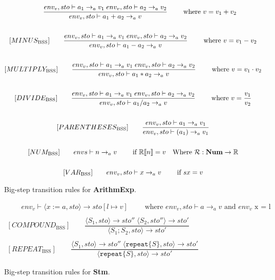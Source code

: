 \begin{figure}[htbp]
	\centering
	\begin{gather*}
		[PLUS_\text{BSS}] 
		\qquad \dfrac
		{\envs \vdash a_1 \rightarrow_a v_1 \; \envs \vdash a_2 \rightarrow_a v_2}
		{\envs \vdash a_1 + a_2 \rightarrow_a v}
		\qquad \text{ where }v = v_1 + v_2
		\\
		\\
		[MINUS_\text{BSS}] 
		\qquad \dfrac
		{\envs \vdash a_1 \rightarrow_a v_1 \; \envs \vdash a_2 \rightarrow_a v_2}
		{\envs \vdash a_1 - a_2 \rightarrow_a v}
		\qquad \text{ where }v = v_1 - v_2
		\\
		\\
		[MULTIPLY_\text{BSS}] 
		\qquad \dfrac
		{\envs \vdash a_1 \rightarrow_a v_1 \; \envs \vdash a_2 \rightarrow_a v_2}
		{\envs \vdash a_1 * a_2 \rightarrow_a v}
		\qquad \text{ where }v = v_1 \cdot v_2
		\\
		\\
		[DIVIDE_\text{BSS}] 
		\qquad \dfrac
		{\envs \vdash a_1 \rightarrow_a v_1 \; \envs \vdash a_2 \rightarrow_a v_2}
		{\envs \vdash a_1 / a_2 \rightarrow_a v}
		\qquad \text{ where }v = \dfrac{v_1}{v_2}
		\\
		\\
		[PARENTHESES_\text{BSS}] 
		\qquad \dfrac
		{\envs \vdash a_1 \rightarrow_a v_1}
		{\envs \vdash (a_1) \rightarrow_a v_1}
		\\
		\\
		[NUM_\text{BSS}] 
		\qquad envs \vdash n \rightarrow_a v
		\qquad \text{ if } \mathbb{R}[\![n]\!] = v \quad \text{Where } \mathcal{R}:\textbf{Num}\rightarrow \mathbb{R}
		\\
		\\
		[VAR_\text{BSS}] 
		\qquad \envs \vdash x \rightarrow_a v
		\qquad \text{ if } sx = v
	\end{gather*}
	\caption{Big-step transition rules for \textbf{ArithmExp}.}
	\label{fig:BssArithm}
\end{figure}

\begin{figure}[htbp]
	\centering
	\begin{gather*}
		[ASSIGNMENT_\text{BSS}] 
		\qquad env_v \vdash \langle x:=a,sto\rangle \rightarrow sto[l\mapsto v]
		\qquad \text{ where }env_v, sto\vdash a \rightarrow_a v \text{ and } env_v \text{ x = l}
		\\
		\\
		[COMPOUND_\text{BSS}] 
		\qquad \dfrac
		{\langle S_1, sto \rangle \rightarrow sto'' \;\langle S_2, sto'' \rangle \rightarrow sto'}
		{\langle S_1;S_2,sto \rangle\rightarrow sto'}
		\\
		\\
		[REPEAT_\text{BSS}] 
		\qquad \dfrac
		{\langle S_1, sto \rangle \rightarrow sto'' \;\langle \texttt{repeat} \{S\}, sto \rangle \rightarrow sto'}
		{\langle \texttt{repeat} \{S\}, sto \rangle\rightarrow sto'}
	\end{gather*}
	\caption{Big-step transition rules for \textbf{Stm}.}
	\label{fig:BssStm}
\end{figure}

